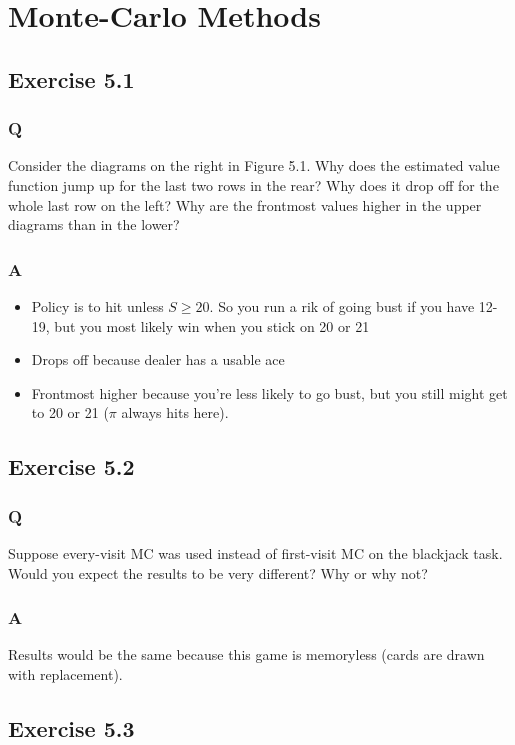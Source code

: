 \section{Monte-Carlo Methods}
\subsection{Exercise 5.1}
\subsubsection*{Q}
Consider the diagrams on the right in Figure 5.1. Why does the estimated value function jump up for the last two rows in the rear? Why does it drop off for the whole last row on the left? Why are the frontmost values higher in the upper diagrams than in the lower?

\subsubsection*{A}
\begin{itemize}
    \item Policy is to hit unless $S \geq 20$. So you run a rik of going bust if you have 12-19, but you most likely win when you stick on 20 or 21
    \item Drops off because dealer has a usable ace
    \item Frontmost higher because you're less likely to go bust, but you still might get to 20 or 21 ($\pi$ always hits here).
\end{itemize}

\subsection{Exercise 5.2}
\subsubsection*{Q}
Suppose every-visit MC was used instead of first-visit MC on the blackjack task. Would you expect the results to be very different? Why or why not?

\subsubsection*{A}
Results would be the same because this game is memoryless (cards are drawn with replacement).

\subsection{Exercise 5.3}
